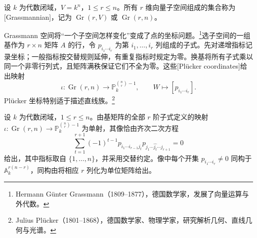 \begin{definition}
\label{g5:def:grassmannian}
	设 \(k\) 为代数闭域，\(V=k^n\)，\(1\leq r\leq n\)。所有 \(r\) 维向量子空间组成的集合称为[Grassmannian]，记为 \(\operatorname{Gr}(r,V)\) 或 \(\operatorname{Gr}(r,n)\)。
\end{definition}

Grassmann 空间将“一个子空间怎样变化”变成了点的坐标问题。\footnote{Hermann Günter Grassmann（1809--1877），德国数学家，发展了向量运算与外代数。}选子空间的一组基作为 \(r\times n\) 矩阵 \(A\) 的行，令 \(p_{i_1\cdots i_r}\) 为第 \(i_1,\ldots,i_r\) 列组成的子式。先对递增指标记录坐标；一般指标按交替规则延伸，有重复指标时规定为零。换基将所有子式乘以同一个非零行列式，且矩阵满秩保证它们不全为零。这些[Plücker coordinates]给出映射
\[
	\iota:\operatorname{Gr}(r,n)\longrightarrow\mathbb P^{\binom nr-1}_k,
	\qquad W\longmapsto[p_{i_1\cdots i_r}].
\]
Plücker 坐标特别适于描述直线族。\footnote{Julius Plücker（1801--1868），德国数学家、物理学家，研究解析几何、直线几何与光谱。}

\begin{theorem}[Plücker 关系]
\label{g5:thm:plucker-relations}
	设 \(k\) 为代数闭域，\(1\leq r\leq n\)。由基矩阵的全部 \(r\) 阶子式定义的映射 \(\iota:\operatorname{Gr}(r,n)\rightarrow\mathbb P^{\binom nr-1}_k\) 为单射，其像恰由齐次二次方程
	\begin{equation}
	\label{g5:eq:plucker-relations}
		\sum_{t=1}^{r+1}(-1)^{t-1}
		p_{i_1\cdots i_{r-1}j_t}
		p_{j_1\cdots\widehat{j_t}\cdots j_{r+1}}=0
	\end{equation}
	给出，其中指标取自 \(\{1,\ldots,n\}\)，并采用交替约定。像中每个开集 \(p_{i_1\cdots i_r}\ne0\) 同构于 \(\mathbb A^{r(n-r)}_k\)，同构由将相应 \(r\) 列化为单位矩阵给出。
\end{theorem}

